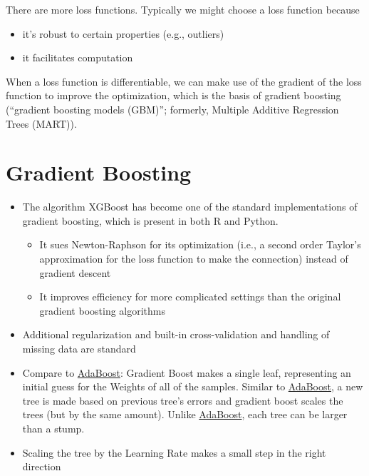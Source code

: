 \documentclass[
]{book}
\begin{document}
There are more loss functions. Typically we might choose a loss function because

\begin{itemize}
\item
  it's robust to certain properties (e.g., outliers)
\item
  it facilitates computation
\end{itemize}

When a loss function is differentiable, we can make use of the gradient of the loss function to improve the optimization, which is the basis of gradient boosting (``gradient boosting models (GBM)''; formerly, Multiple Additive Regression Trees (MART)).

\hypertarget{gradient-boosting}{%
\section{Gradient Boosting}\label{gradient-boosting}}

\begin{itemize}
\item
  The algorithm XGBoost has become one of the standard implementations of gradient boosting, which is present in both R and Python.

  \begin{itemize}
  \item
    It sues Newton-Raphson for its optimization (i.e., a second order Taylor's approximation for the loss function to make the connection) instead of gradient descent
  \item
    It improves efficiency for more complicated settings than the original gradient boosting algorithms
  \end{itemize}
\item
  Additional regularization and built-in cross-validation and handling of missing data are standard
\item
  Compare to \protect\hyperlink{adaboost}{AdaBoost}: Gradient Boost makes a single leaf, representing an initial guess for the Weights of all of the samples. Similar to \protect\hyperlink{adaboost}{AdaBoost}, a new tree is made based on previous tree's errors and gradient boost scales the trees (but by the same amount). Unlike \protect\hyperlink{adaboost}{AdaBoost}, each tree can be larger than a stump.
\item
  Scaling the tree by the Learning Rate makes a small step in the right direction
\end{itemize}
\end{document}
